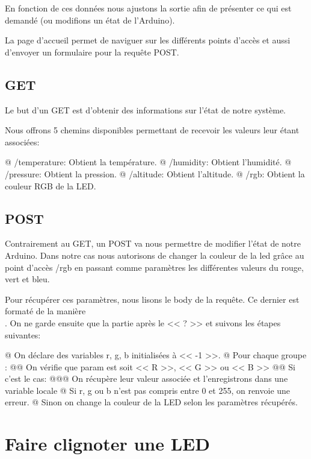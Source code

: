 \documentclass{report}
\begin{document}
		En fonction de ces données nous ajustons la sortie afin de présenter ce qui est demandé (ou modifions un état de l'Arduino).
		
		La page d'accueil permet de naviguer sur les différents points d'accès et aussi d'envoyer un formulaire pour la requête POST.
		
		
		\section{GET}
			Le but d'un GET est d'obtenir des informations sur l'état de notre système.
			
			Nous offrons 5 chemins disponibles permettant de recevoir les valeurs leur étant associées:
			\begin{easylist}
				@ /temperature: Obtient la température.
				@ /humidity: Obtient l'humidité.
				@ /pressure: Obtient la pression.
				@ /altitude: Obtient l'altitude.
				@ /rgb: Obtient la couleur RGB de la LED.
			\end{easylist}
		
		\section{POST}
			Contrairement au GET, un POST va nous permettre de modifier l'état de notre Arduino.
			Dans notre cas nous autorisons de changer la couleur de la led grâce au point d'accès /rgb en passant comme paramètres les différentes valeurs du rouge, vert et bleu.
			
			Pour récupérer ces paramètres, nous lisons le body de la requête.
			Ce dernier est formaté de la manière \\.
			On ne garde ensuite que la partie après le << ? >> et suivons les étapes suivantes:
			\begin{easylist}[itemize]
				@ On déclare des variables r, g, b initialisées à << -1 >>.
				@ Pour chaque groupe :
				@@ On vérifie que param est soit << R >>, << G >> ou << B >>
				@@ Si c'est le cas:
				@@@ On récupère leur valeur associée et l'enregistrons dans une variable locale
				@ Si r, g ou b n'est pas compris entre 0 et 255, on renvoie une erreur.
				@ Sinon on change la couleur de la LED selon les paramètres récupérés.
			\end{easylist}
			
  		
\appendix
	\chapter{Faire clignoter une LED\label{code:led}}
		
			
\end{document}
